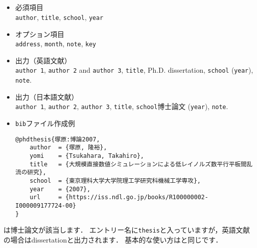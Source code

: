 \documentclass[a4paper,fleqn,uplatex,dvipdfmx]{jsarticle}
\begin{document}
\subsection{\ttphdthesis}
\label{ssec:phdthesis}
\begin{screen}
    \begin{itemize}
        \item 必須項目 \\
        \verb|author|, \verb|title|, \verb|school|, \verb|year|
        \item オプション項目 \\
        \verb|address|, \verb|month|, \verb|note|, \verb|key|
        \item 出力（英語文献） \\
            \colorbox[gray]{0.8}{\texttt{author 1}}, \colorbox[gray]{0.8}{\texttt{author 2}} and \colorbox[gray]{0.8}{\texttt{author 3}}, \colorbox[gray]{0.8}{\texttt{title}}, Ph.D. dissertation, \colorbox[gray]{0.8}{\texttt{school}} (\colorbox[gray]{0.8}{\texttt{year}}), \colorbox[gray]{0.8}{\texttt{note}}.
        \item 出力（日本語文献） \\
            \colorbox[gray]{0.8}{\texttt{author 1}}, \colorbox[gray]{0.8}{\texttt{author 2}}, \colorbox[gray]{0.8}{\texttt{author 3}}, \colorbox[gray]{0.8}{\texttt{title}}, \colorbox[gray]{0.8}{\texttt{school}}博士論文 (\colorbox[gray]{0.8}{\texttt{year}}), \colorbox[gray]{0.8}{\texttt{note}}.
        \item \verb|bib|ファイル作成例 \vspace{-3mm}
\begin{verbatim}
@phdthesis{塚原:博論2007,
    author  = {塚原, 隆裕},
    yomi    = {Tsukahara, Takahiro},
    title   = {大規模直接数値シミュレーションによる低レイノルズ数平行平板間乱流の研究},
    school  = {東京理科大学大学院理工学研究科機械工学専攻},
    year    = {2007},
    url     = {https://iss.ndl.go.jp/books/R100000002-I000009177724-00}
}
\end{verbatim}
    \end{itemize}
\end{screen}

\ttphdthesis は博士論文が該当します．
エントリー名に\verb|thesis|と入っていますが，英語文献の場合はdissertationと出力されます．
基本的な使い方は\ttmastersthesis と同じです．
\end{document}
